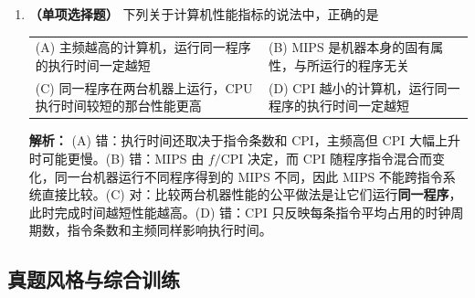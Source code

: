 \begin{enumerate}
\item \textbf{（单项选择题）} 下列关于计算机性能指标的说法中，正确的是
\begin{center}
\begin{tabularx}{0.96\linewidth}{@{}X X@{}}
(A) 主频越高的计算机，运行同一程序的执行时间一定越短 & (B) MIPS 是机器本身的固有属性，与所运行的程序无关 \\[4pt]
(C) 同一程序在两台机器上运行，CPU 执行时间较短的那台性能更高 & (D) CPI 越小的计算机，运行同一程序的执行时间一定越短
\end{tabularx}
\end{center}

\ifshowsolutions\par\noindent\textbf{解析：} (A) 错：执行时间还取决于指令条数和 CPI，主频高但 CPI 大幅上升时可能更慢。(B) 错：MIPS 由 $f/\mathrm{CPI}$ 决定，而 CPI 随程序指令混合而变化，同一台机器运行不同程序得到的 MIPS 不同，因此 MIPS 不能跨指令系统直接比较。(C) 对：比较两台机器性能的公平做法是让它们运行\textbf{同一程序}，此时完成时间越短性能越高。(D) 错：CPI 只反映每条指令平均占用的时钟周期数，指令条数和主频同样影响执行时间。\else \answerarea \fi

\end{enumerate}

\subsection{真题风格与综合训练}

